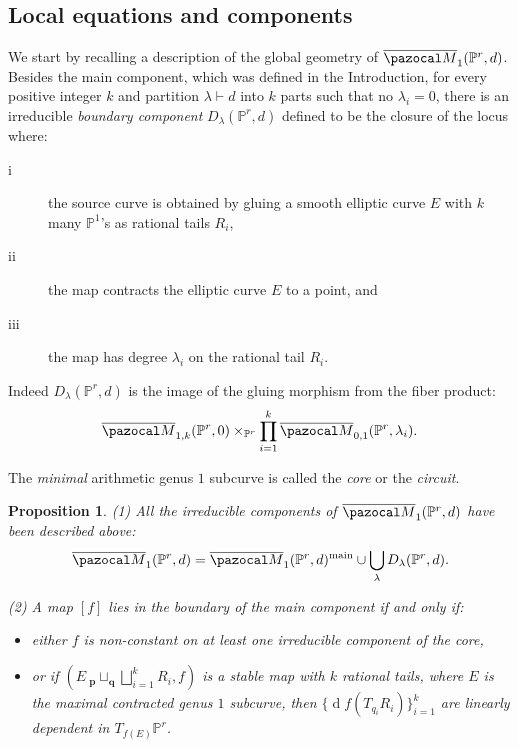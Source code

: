 \documentclass[11pt]{amsart}
\newcommand{\M}[4]{\overline{\pazocal M}_{#1,#2}(#3,#4)}
\newcommand{\PP}{\mathbb P}
\newcommand{\oM}{\overline{\pazocal M}}
\theoremstyle{plain}
\newtheorem{prop}[thm]{Proposition}
\theoremstyle{definition}
\begin{document}
\subsection{Local equations and components}
We start by recalling a description of the global geometry of $\oM_1(\PP^r,d)$. Besides the main component, which was defined in the Introduction, for every positive integer $k$ and partition $\lambda\vdash d$ into $k$ parts such that no $\lambda_i=0$, there is an irreducible \emph{boundary component} $D_{\lambda}(\PP^r,d)$ defined to be the closure of the locus where:
\begin{description}
\item[i] the source curve is obtained by gluing a smooth elliptic curve $E$ with $k$ many $\PP^1$'s as rational tails $R_i$,
\item[ii] the map contracts the elliptic curve $E$ to a point, and
\item[iii] the map has degree $\lambda_i$ on the rational tail $R_i$.
\end{description}
Indeed $D_{\lambda}(\PP^r,d)$ is the image of the gluing morphism from the fiber product:
$$\M{1}{k}{\PP^r}{0}\times_{\PP^r}\prod_{i=1}^k\M{0}{1}{\PP^r}{\lambda_i}.$$

\noindent The \emph{minimal} arithmetic genus $1$ subcurve is called the \emph{core} or the \emph{circuit}. %
\begin{prop}\label{prop:components}
\emph{(1)} All the irreducible components of $\oM_1(\PP^r,d)$ have been described above: %
\[\oM_1(\PP^r,d)=\oM_1(\PP^r,d)^{\rm{main}}\cup\bigcup_{\lambda}D_{\lambda}(\PP^r,d).\]

\emph{(2)} A map $[f]$ lies in \emph{the boundary of the main component}  if and only if:
\begin{itemize}
\item either $f$ is non-constant on at least one irreducible component of the core,
\item or if $(E\ {}_{\mathbf p}\!\sqcup_{\mathbf q}\bigsqcup_{i=1}^k R_i,f)$ is a stable map with $k$ rational tails, where $E$ is the \emph{maximal} contracted genus $1$ subcurve, then $\{\operatorname{d}\!f(T_{q_i}R_i)\}_{i=1}^k$ are \emph{linearly dependent} in $T_{f(E)}\PP^r$.
\end{itemize}
\end{prop}
 
\end{document}
